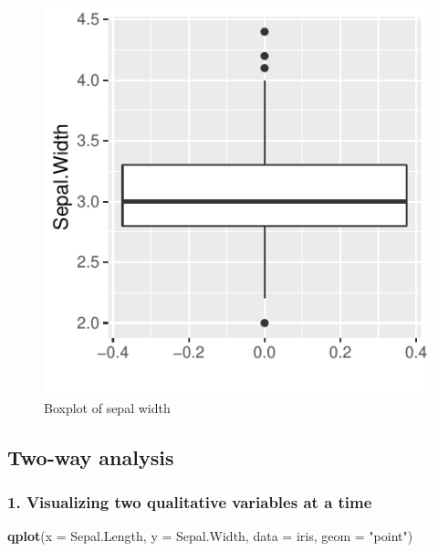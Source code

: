 \documentclass[]{article}
\newenvironment{Shaded}{\begin{snugshade}}{\end{snugshade}}
\newcommand{\DataTypeTok}[1]{\textcolor[rgb]{0.13,0.29,0.53}{#1}}
\newcommand{\KeywordTok}[1]{\textcolor[rgb]{0.13,0.29,0.53}{\textbf{#1}}}
\newcommand{\NormalTok}[1]{#1}
\newcommand{\StringTok}[1]{\textcolor[rgb]{0.31,0.60,0.02}{#1}}
\begin{document}
\begin{figure}
\centering
\includegraphics{Week3Answers_files/figure-latex/unnamed-chunk-7-1.pdf}
\caption{Boxplot of sepal width}
\end{figure}

\hypertarget{two-way-analysis}{%
\subsection{Two-way analysis}\label{two-way-analysis}}

\hypertarget{visualizing-two-qualitative-variables-at-a-time}{%
\subsubsection{1. Visualizing two qualitative variables at a
time}\label{visualizing-two-qualitative-variables-at-a-time}}

\begin{Shaded}
\begin{Highlighting}[]
\KeywordTok{qplot}\NormalTok{(}\DataTypeTok{x =}\NormalTok{ Sepal.Length, }\DataTypeTok{y =}\NormalTok{ Sepal.Width, }\DataTypeTok{data =}\NormalTok{ iris, }\DataTypeTok{geom =} \StringTok{"point"}\NormalTok{)}
\end{Highlighting}
\end{Shaded}
\end{document}
